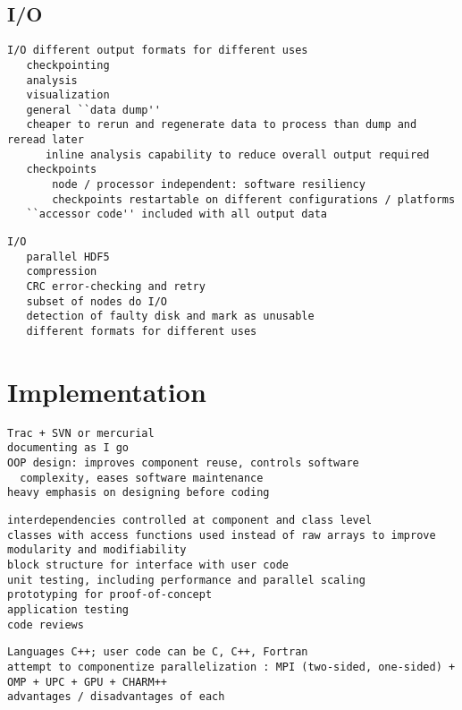 \documentclass[14pt,letter]{article}
\begin{document}
\subsection{I/O} \label{ss:io}

\begin{verbatim}
I/O different output formats for different uses
   checkpointing
   analysis
   visualization
   general ``data dump''
   cheaper to rerun and regenerate data to process than dump and reread later
      inline analysis capability to reduce overall output required
   checkpoints
       node / processor independent: software resiliency
       checkpoints restartable on different configurations / platforms
   ``accessor code'' included with all output data
\end{verbatim}
\begin{verbatim}
I/O
   parallel HDF5
   compression
   CRC error-checking and retry
   subset of nodes do I/O
   detection of faulty disk and mark as unusable
   different formats for different uses
\end{verbatim}

\section{Implementation} \label{s:implementation}

\begin{verbatim}
Trac + SVN or mercurial
documenting as I go
OOP design: improves component reuse, controls software
  complexity, eases software maintenance
heavy emphasis on designing before coding
\end{verbatim}

\begin{verbatim}
interdependencies controlled at component and class level
classes with access functions used instead of raw arrays to improve modularity and modifiability
block structure for interface with user code
unit testing, including performance and parallel scaling
prototyping for proof-of-concept
application testing
code reviews
\end{verbatim}

\begin{verbatim}
Languages C++; user code can be C, C++, Fortran
attempt to componentize parallelization : MPI (two-sided, one-sided) + OMP + UPC + GPU + CHARM++
advantages / disadvantages of each
\end{verbatim}
\end{document}
